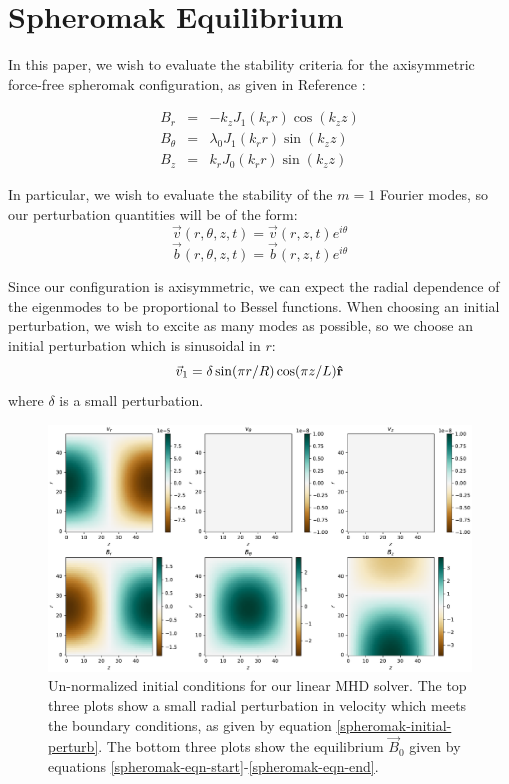\documentclass[%
 reprint,
 amsmath,amssymb,
 aps,
]{revtex4-2}
\begin{document}
\section{Spheromak Equilibrium}

In this paper, we wish to evaluate the stability criteria for the axisymmetric force-free spheromak configuration, as given in Reference \cite{BondesonA1981Tioa}:

\begin{eqnarray}
B_r & = & - k_z J_1(k_r r) \cos (k_z z) \label{spheromak-eqn-start}\\
B_\theta & = & \lambda_0 J_1(k_r  r) \sin (k_z z) \\
B_z & = & k_r J_0(k_r r) \sin (k_z z) \label{spheromak-eqn-end}
\end{eqnarray}

In particular, we wish to evaluate the stability of the $m=1$ Fourier modes, so our perturbation quantities will be of the form:
\begin{equation}
\vec v(r, \theta, z, t) = \vec v(r, z, t) e^{i \theta}
\end{equation}
\begin{equation}
\vec b(r, \theta, z, t) = \vec b(r, z, t) e^{i \theta}
\end{equation}

Since our configuration is axisymmetric, we can expect the radial dependence of the eigenmodes to be proportional to Bessel functions. When choosing an initial perturbation, we wish to excite as many modes as possible, so we choose an initial perturbation which is sinusoidal in $r$:
\begin{equation}
\vec v_1 = \delta \sin(\pi r/R) \cos (\pi z /L) \vu r \label{spheromak-initial-perturb}
\end{equation}
where $\delta$ is a small perturbation. 

\begin{figure}
\includegraphics[width=\linewidth]{proj2-3/spheromak_initial_config.pdf}
\caption{\label{fig:spheromak-initial-conditions}Un-normalized initial conditions for our linear MHD solver. The top three plots show a small radial perturbation in velocity which meets the boundary conditions, as given by equation \ref{spheromak-initial-perturb}. The bottom three plots show the equilibrium $\vec B_0$ given by equations \ref{spheromak-eqn-start}-\ref{spheromak-eqn-end}. }
\end{figure}
\end{document}
